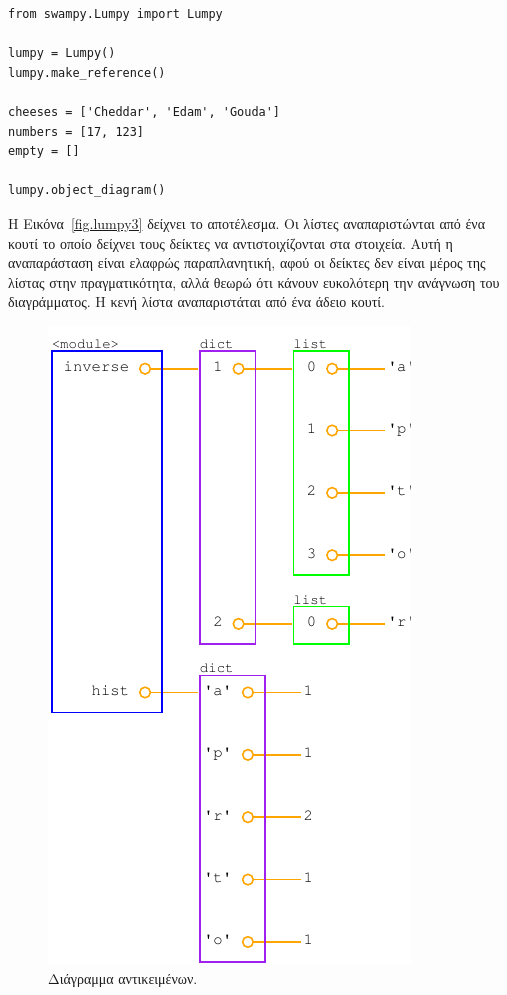 \documentclass[10pt]{book}
\begin{document}
\begin{verbatim}
from swampy.Lumpy import Lumpy

lumpy = Lumpy()
lumpy.make_reference()

cheeses = ['Cheddar', 'Edam', 'Gouda']
numbers = [17, 123]
empty = []

lumpy.object_diagram()
\end{verbatim}

Η Εικόνα~\ref{fig.lumpy3} δείχνει το αποτέλεσμα.  Οι λίστες αναπαριστώνται από ένα κουτί το οποίο δείχνει
τους δείκτες να αντιστοιχίζονται στα στοιχεία.  Αυτή η αναπαράσταση είναι ελαφρώς παραπλανητική, αφού οι
δείκτες δεν είναι μέρος της λίστας στην πραγματικότητα, αλλά θεωρώ ότι κάνουν ευκολότερη την ανάγνωση του
διαγράμματος.  Η κενή λίστα αναπαριστάται από ένα άδειο κουτί.

\begin{figure}
\centerline
{\includegraphics[scale=0.7]{figs/lumpydemo4.pdf}}
\caption{Διάγραμμα αντικειμένων.}
\label{fig.lumpy4}
\end{figure}
\end{document}
